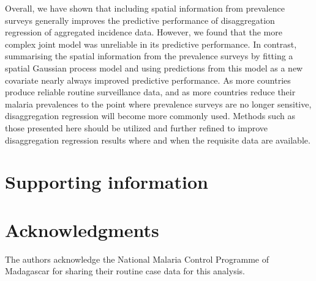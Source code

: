 \documentclass{statsoc}
\begin{document}
Overall, we have shown that including spatial information from prevalence surveys generally improves the predictive performance of disaggregation regression of aggregated incidence data.
However, we found that the more complex joint model was unreliable in its predictive performance.
In contrast, summarising the spatial information from the prevalence surveys by fitting a spatial Gaussian process model and using predictions from this model as a new covariate nearly always improved predictive performance.
As more countries produce reliable routine surveillance data, and as more countries reduce their malaria prevalences to the point where prevalence surveys are no longer sensitive, disaggregation regression will become more commonly used. 
Methods such as those presented here should be utilized and further refined to improve disaggregation regression results where and when the requisite data are available.



\section*{Supporting information}


\section*{Acknowledgments}
The authors acknowledge the National Malaria Control Programme of Madagascar for sharing their routine case data for this analysis.






 
\end{document}
